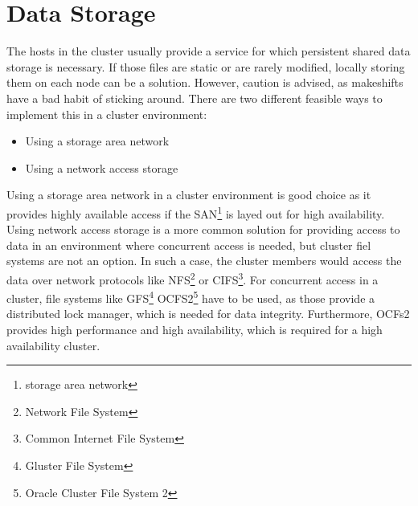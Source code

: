 
\section{Data Storage}

The hosts in the cluster usually provide a service for which persistent shared data storage is necessary.
If those files are static or are rarely modified, locally storing them on each node can be a solution. However, caution is advised, as makeshifts have a bad habit of sticking around.
There are two different feasible ways to implement this in a cluster environment:
\begin{itemize}
\item Using a storage area network
\item Using a network access storage
\end{itemize}

Using a storage area network in a cluster environment is good choice as it provides highly available access if the SAN\footnote{storage area network} is layed out for high availability.
Using network access storage is a more common solution for providing access to data in an environment where concurrent access is needed, but cluster fiel systems are not an option. In such a case, the cluster members would access the data over network protocols like NFS\footnote{Network File System} or CIFS\footnote{Common Internet File System}. For concurrent access in a cluster, file systems like GFS\footnote{Gluster File System} OCFS2\footnote{Oracle Cluster File System 2} have to be used, as those provide a distributed lock manager, which is needed for data integrity. Furthermore, OCFs2 provides high performance and high availability, which is required for a high availability cluster.
